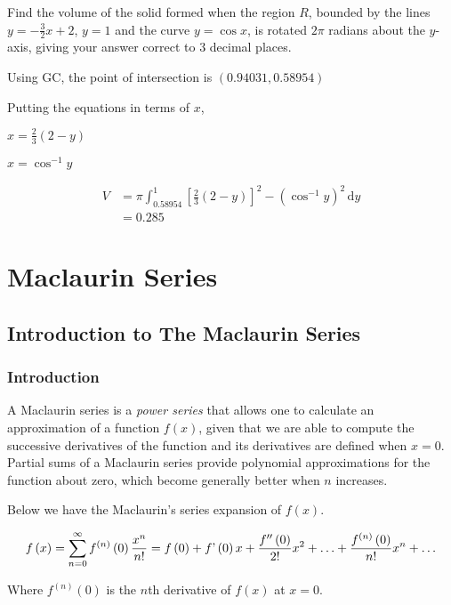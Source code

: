 \documentclass[11pt,a4paper]{book}
\begin{document}
\begin{example}

Find the volume of the solid formed when the region $R$, bounded
by the lines ${\displaystyle y=-\frac{3}{2}x+2}$, $y=1$ and the
curve $y=\cos x$, is rotated $2\pi$ radians about the $y$-axis,
giving your answer correct to 3 decimal places.

\Solution

Using GC, the point of intersection is $(0.94031,0.58954)$

Putting the equations in terms of $x$,

${\displaystyle x=\frac{2}{3}\left(2-y\right)}$

$x=\cos^{-1}y$

\begin{align*}
V & =\pi\int_{0.58954}^{1}\left[\frac{2}{3}(2-y)\right]^{2}-(\cos^{-1}y)^{2}\,\mathrm{d}y\\
 & =0.285
\end{align*}

\end{example}

\chapter{Maclaurin Series}

\section{Introduction to The Maclaurin Series}

\subsection{Introduction}

A Maclaurin series is a \textit{power series} that allows one to calculate
an approximation of a function $f\left(x\right)$, given that we are
able to compute the successive derivatives of the function and its
derivatives are defined when $x=0$. Partial sums of a Maclaurin series
provide polynomial approximations for the function about zero, which
become generally better when $n$ increases.

\begin{tcolorbox}[colback=blue!5, colframe=black, boxrule=.4pt, sharpish corners]

Below we have the Maclaurin's series expansion of $f\left(x\right)$.

\[
f\left(x\right)=\sum\limits _{n=0}^{\infty}f^{\left(n\right)}\left(0\right)\frac{x^{n}}{n!}=f\left(0\right)+f\text{\textquoteright}\left(0\right)x+\frac{f^{\prime\prime}\left(0\right)}{2!}x^{2}+\ldots+\frac{f^{\left(n\right)}\left(0\right)}{n!}x^{n}+\ldots
\]

Where $f^{\left(n\right)}\left(0\right)$ is the $n$th derivative
of $f\left(x\right)$ at $x=0$.
\end{tcolorbox}
\end{document}
